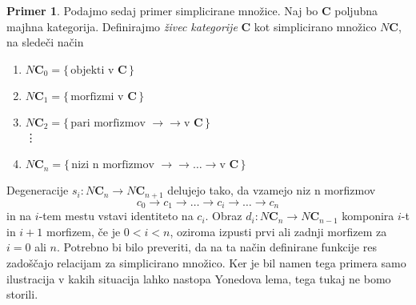 \documentclass[12pt,a4paper]{book}
\theoremstyle{definition}
\theoremstyle{plain}
\theoremstyle{definition}
\newtheorem{primer}{Primer}[section]
\theoremstyle{remark}
\newcommand{\cat}[1]{\textbf{#1}}
\renewcommand{\set}[1]{\{\,#1\,\}}
\begin{document}
\begin{primer}
Podajmo sedaj primer simplicirane množice. Naj bo $\cat{C}$ poljubna majhna kategorija. Definirajmo \emph{živec kategorije} $\cat{C}$ kot simplicirano množico $N\cat{C}$, na sledeči način

\begin{enumerate}[label={}]
\item $N\cat{C}_0 = \set{\text{objekti v } \cat{C}}$
\item $N\cat{C}_1 = \set{\text{morfizmi v } \cat{C}}$
\item $N\cat{C}_2 = \set{\text{pari morfizmov } \rightarrow\rightarrow \text{v } \cat{C}}$ \\ %
\vdots
\item $N\cat{C}_n = \set{\text{nizi n morfizmov } \rightarrow\rightarrow\ldots\rightarrow \text{v } \cat{C}}$
\end{enumerate}
Degeneracije $s_i:N\cat{C}_n \to N\cat{C}_{n+1}$ delujejo tako, da vzamejo niz n morfizmov
$$ c_0 \rightarrow c_1 \rightarrow \ldots \rightarrow c_i \rightarrow \ldots \rightarrow c_n$$
in na $i$-tem mestu vstavi identiteto na $c_i$. Obraz $d_i : N\cat{C}_n \to N\cat{C}_{n-1}$ komponira $i$-t in $i+1$ morfizem, če je $0 < i < n$, oziroma izpusti prvi ali zadnji morfizem za $i = 0$ ali $n$.
Potrebno bi bilo preveriti, da na ta način definirane funkcije res zadoščajo relacijam za simplicirano množico. Ker je bil namen tega primera samo ilustracija v kakih situacija lahko nastopa Yonedova lema, tega tukaj ne bomo storili.
\end{primer}
\end{document}
